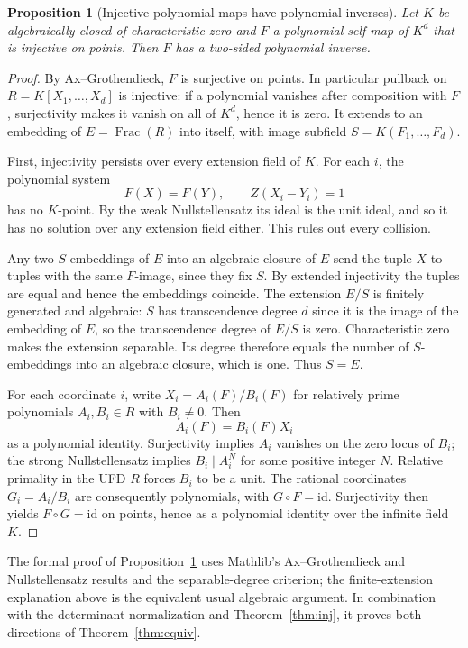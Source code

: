 \documentclass[11pt,a4paper]{article}
\newtheorem{proposition}[theorem]{Proposition}
\begin{document}
\begin{proposition}[Injective polynomial maps have polynomial inverses]\label{prop:inverse}
Let $K$ be algebraically closed of characteristic zero and $F$ a polynomial self-map of $K^d$ that is injective on points. Then $F$ has a two-sided polynomial inverse.
\end{proposition}
\begin{proof}
By Ax--Grothendieck, $F$ is surjective on points. In particular pullback on $R=K[X_1,\ldots,X_d]$ is injective: if a polynomial vanishes after composition with $F$, surjectivity makes it vanish on all of $K^d$, hence it is zero. It extends to an embedding of $E=\operatorname{Frac}(R)$ into itself, with image subfield $S=K(F_1,\ldots,F_d)$.

First, injectivity persists over every extension field of $K$. For each $i$, the polynomial system
\[
 F(X)=F(Y),\qquad Z(X_i-Y_i)=1
\]
has no $K$-point. By the weak Nullstellensatz its ideal is the unit ideal, and so it has no solution over any extension field either. This rules out every collision.

Any two $S$-embeddings of $E$ into an algebraic closure of $E$ send the tuple $X$ to tuples with the same $F$-image, since they fix $S$. By extended injectivity the tuples are equal and hence the embeddings coincide. The extension $E/S$ is finitely generated and algebraic: $S$ has transcendence degree $d$ since it is the image of the embedding of $E$, so the transcendence degree of $E/S$ is zero. Characteristic zero makes the extension separable. Its degree therefore equals the number of $S$-embeddings into an algebraic closure, which is one. Thus $S=E$.

For each coordinate $i$, write $X_i=A_i(F)/B_i(F)$ for relatively prime polynomials $A_i,B_i\in R$ with $B_i\ne0$. Then
\[
 A_i(F)=B_i(F)X_i
\]
as a polynomial identity. Surjectivity implies $A_i$ vanishes on the zero locus of $B_i$; the strong Nullstellensatz implies $B_i\mid A_i^N$ for some positive integer $N$. Relative primality in the UFD $R$ forces $B_i$ to be a unit. The rational coordinates $G_i=A_i/B_i$ are consequently polynomials, with $G\circ F=\mathrm{id}$. Surjectivity then yields $F\circ G=\mathrm{id}$ on points, hence as a polynomial identity over the infinite field $K$.
\end{proof}
The formal proof of Proposition~\ref{prop:inverse} uses Mathlib's Ax--Grothendieck and Nullstellensatz results and the separable-degree criterion; the finite-extension explanation above is the equivalent usual algebraic argument. In combination with the determinant normalization and Theorem~\ref{thm:inj}, it proves both directions of Theorem~\ref{thm:equiv}.
\end{document}
